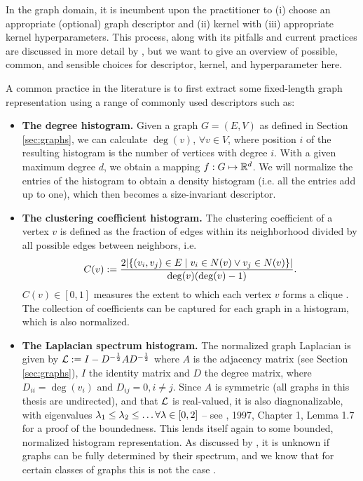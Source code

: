 In the graph domain, it is incumbent upon the practitioner to (i) choose an
appropriate (optional) graph descriptor and (ii) kernel with (iii) appropriate
kernel hyperparameters. This process, along with its pitfalls and current
practices are discussed in more detail by \cite{obray2022evaluation}, but we
want to give an overview of possible, common, and sensible choices for
descriptor, kernel, and hyperparameter here.

A common practice in the literature is to first extract some fixed-length graph
representation using a range of commonly used descriptors such as:
\begin{itemize}
\item \textbf{The degree histogram.} Given a graph $G=(E,V)$ as defined in
Section \ref{sec:graphs}, we can calculate $\deg(v)$, $\forall v\in V$, where
position $i$ of the resulting histogram is the number of vertices with degree
$i$. With a given maximum degree $d$, we obtain a mapping $f:G\mapsto\mathbb{R}^d$. We
will normalize the entries of the histogram to obtain a density histogram (i.e.
all the entries add up to one), which then becomes a size-invariant descriptor.

\item \textbf{The clustering coefficient histogram.} The clustering coefficient
of a vertex $v$ is defined as the fraction of edges within its neighborhood
divided by all possible edges between neighbors, i.e.
  \begin{equation}
    C(v) := \frac{2\mleft|\mleft\{(v_i, v_j) \in E \mid  v_i \in N(v) \lor v_j \in N(v) \mright\}\mright|}{\deg(v) \mleft(\deg(v) - 1\mright)}.
  \end{equation}
  $C(v)\in\left[ 0,1 \right]$ measures the extent to which each vertex $v$ forms
  a clique \citep{watts1998collective}. The collection of coefficients can be
  captured for each graph in a histogram, which is also normalized.

\item \textbf{The Laplacian spectrum histogram.} The normalized graph Laplacian
is given by $\mathcal{L} :=I-D^{-{1\over 2}}AD^{-{1\over 2}}$ where $A$ is the
adjacency matrix (see Section \ref{sec:graphs}), $I$ the identity matrix and $D$
the degree matrix, where $D_{ii}=\deg(v_i)$ and $D_{ij}=0, i\neq j$. Since $A$
is symmetric (all graphs in this thesis are undirected), and that $\mathcal{L}$ is
real-valued, it is also diagnonalizable, with eigenvalues
$\lambda_1\leq\lambda_2\leq\ldots\forall\lambda\in \left[0,2\right]$ -- see
\cite{chung1997spectral}, 1997, Chapter 1, Lemma 1.7 for a proof of the
boundedness. This lends itself again to some bounded, normalized histogram
representation. As discussed by \cite{obray2022evaluation}, it is unknown if graphs
can be fully determined by their spectrum, and we know that for certain classes
of graphs this is not the case \citep{schwenk1973almost}.

\end{itemize}

